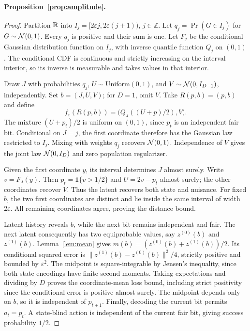 \paragraph{Proposition~\ref{prop:amplitude}.}
\begin{proof}
Partition $\mathbb{R}$ into $I_j=[2\varepsilon j,2\varepsilon(j+1))$, $j\in\mathbb Z$.
Let $q_j=\Pr(G\in I_j)$ for $G\sim\mathcal{N}(0,1)$.
Every $q_j$ is positive and their sum is one.
Let $F_j$ be the conditional Gaussian distribution function on $I_j$, with inverse quantile function $Q_j$ on $(0,1)$.
The conditional CDF is continuous and strictly increasing on the interval interior, so its inverse is measurable and takes values in that interior.

Draw $J$ with probabilities $q_j$, $U\sim\mathrm{Uniform}(0,1)$, and $V\sim\mathcal{N}(0,I_{D-1})$, independently.
Set $b=(J,U,V)$; for $D=1$, omit $V$.
Take $R(p,b)=(p,b)$ and define
\begin{equation}
f_\varepsilon(R(p,b))=\big(Q_J((U+p)/2),V\big).
\end{equation}
The mixture $(U+p_t)/2$ is uniform on $(0,1)$, since $p_t$ is an independent fair bit.
Conditional on $J=j$, the first coordinate therefore has the Gaussian law restricted to $I_j$.
Mixing with weights $q_j$ recovers $\mathcal{N}(0,1)$.
Independence of $V$ gives the joint law $\mathcal{N}(0,I_D)$ and zero population regularizer.

Given the first coordinate $y$, its interval determines $J$ almost surely.
Write $v=F_J(y)$.
Then $p_t=\mathbf1\{v>1/2\}$ and $U=2v-p_t$ almost surely; the other coordinates recover $V$.
Thus the latent recovers both state and nuisance.
For fixed $b$, the two first coordinates are distinct and lie inside the same interval of width $2\varepsilon$.
All remaining coordinates agree, proving the distance bound.

Latent history reveals $b$, while the next bit remains independent and fair.
The next latent consequently has two equiprobable values, say $z^{(0)}(b)$ and $z^{(1)}(b)$.
Lemma~\ref{lem:mean} gives $m(b)=(z^{(0)}(b)+z^{(1)}(b))/2$.
Its conditional squared error is $\|z^{(1)}(b)-z^{(0)}(b)\|^2/4$, strictly positive and bounded by $\varepsilon^2$.
The midpoint is square-integrable by Jensen's inequality, since both state encodings have finite second moments.
Taking expectations and dividing by $D$ proves the coordinate-mean loss bound, including strict positivity since the conditional error is positive almost surely.
The midpoint depends only on $b$, so it is independent of $p_{t+1}$.
Finally, decoding the current bit permits $a_t=p_t$.
A state-blind action is independent of the current fair bit, giving success probability $1/2$.
\end{proof}


